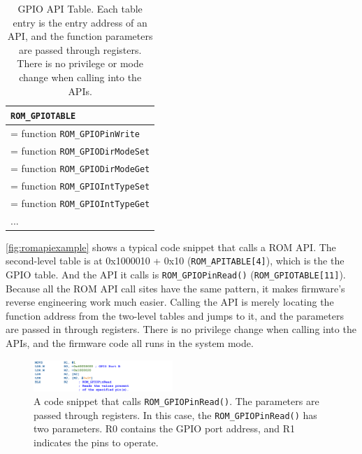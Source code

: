 \begin{center}
	\begin{table}
		\small
		\begin{tabular}{|p{7.2cm}|} 
			\hline
			\texttt{ROM\_GPIOTABLE} \\ [0.5ex] 
			\hline
			[0] = function \texttt{ROM\_GPIOPinWrite} \\
			\hline
			[1] = function \texttt{ROM\_GPIODirModeSet} \\
			\hline
			[2] = function \texttt{ROM\_GPIODirModeGet} \\
			\hline
			[3] = function \texttt{ROM\_GPIOIntTypeSet} \\
			\hline
			[4] = function \texttt{ROM\_GPIOIntTypeGet} \\
			\hline
			... \\ 
			\hline
		\end{tabular}
		\caption{GPIO API Table. Each table entry is the entry address of an API, and the function parameters are passed through registers. There is no privilege or mode change when calling into the APIs.}
		\label{tab:gpiotable}
	\end{table}
\end{center}



\autoref{fig:romapiexample} shows a typical code snippet that calls a ROM API. The second-level table is at 0x1000010 + 0x10 (\texttt{ROM\_APITABLE[4]}), which is the the GPIO table. And the API it calls is \texttt{ROM\_GPIOPinRead()} (\texttt{ROM\_GPIOTABLE[11]}). Because all the ROM API call sites have the same pattern, it makes firmware's reverse engineering work much easier.  Calling the API is merely locating the function address from the two-level tables and jumps to it, and the parameters are passed in through registers. There is no privilege change when calling into the APIs, and the firmware code all runs in the system mode.


\begin{figure}[th]
	\includegraphics[width=0.47\textwidth]{figures/romapiexample2}
	\centering
	\caption{A code snippet that calls \texttt{ROM\_GPIOPinRead()}. The parameters are passed through registers. In this case, the  \texttt{ROM\_GPIOPinRead()} has two parameters. R0 contains the GPIO port address, and R1 indicates the pins to operate.}
	\label{fig:romapiexample}
\end{figure}




